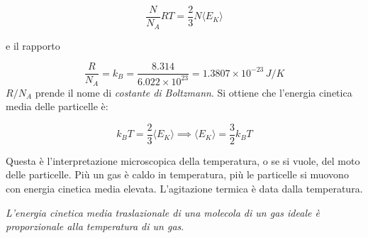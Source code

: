 \[
	\frac{N}{N_A } RT = \frac{2}{3} N \langle E_K \rangle
\]

e il rapporto

\[
	\frac{R}{N_A } = k_B = \frac{8.314}{6.022 \times 10^{23} } = 1.3807 \times 10^{-23}\,J/K
\]
$R/N_A$ prende il nome di \emph{costante di Boltzmann}. Si ottiene che l'energia cinetica media delle particelle è:

\[
	k_B T = \frac{2}{3} \langle E_K \rangle \implies \boxed{\langle E_K \rangle = \frac{3}{2} k_B T}
\]

Questa è l'interpretazione microscopica della temperatura, o se si vuole, del moto delle particelle. Più un gas è caldo in temperatura, più le particelle si muovono con energia cinetica media elevata. L'agitazione termica è data dalla temperatura.

\emph{L'energia cinetica media traslazionale di una molecola di un gas ideale è proporzionale alla temperatura di un gas}.